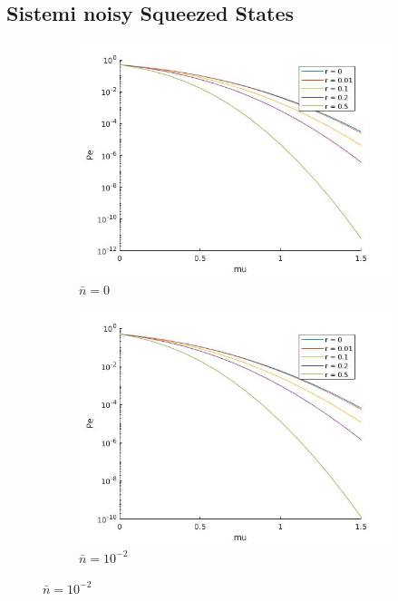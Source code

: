 \documentclass[a4paper,11pt]{article}
\begin{document}
    \subsection{Sistemi \foreignlanguage{english}{noisy Squeezed States}}
    
    \begin{figure}[ht]
        \caption{\foreignlanguage{english}{Squeezed} BPSK, $\theta=\pi$, $p_0=p_1=\frac{1}{2}$}

        \begin{subfigure}{0.49\textwidth}
            \includegraphics[width=\linewidth]{SSBPSK.jpg}
            \caption{$\bar{n}=0$}
        \end{subfigure}
        \hspace*{\fill}
        \begin{subfigure}{0.49\textwidth}
            \includegraphics[width=\linewidth]{SSBPSKNoisy.jpg}
            \caption{$\bar{n}=10^{-2}$}
        \end{subfigure}
        \label{fig:5}
    \end{figure}
\end{document}
